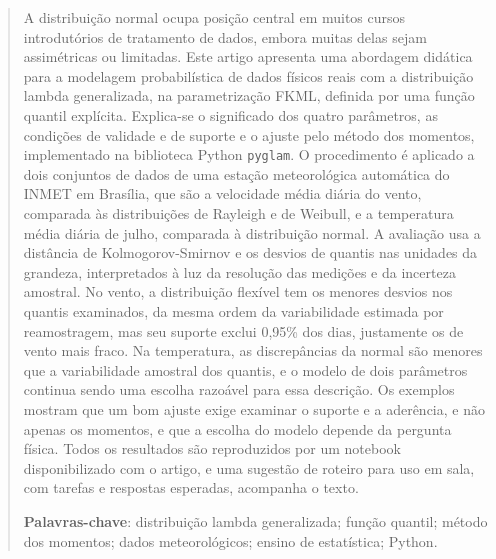 \begin{otherlanguage}{brazilian}
\begin{abstract}
A distribuição normal ocupa posição central em muitos cursos introdutórios de tratamento de dados, embora muitas delas sejam assimétricas ou limitadas. Este artigo apresenta uma abordagem didática para a modelagem probabilística de dados físicos reais com a distribuição lambda generalizada, na parametrização FKML, definida por uma função quantil explícita. Explica-se o significado dos quatro parâmetros, as condições de validade e de suporte e o ajuste pelo método dos momentos, implementado na biblioteca Python \texttt{pyglam}. O procedimento é aplicado a dois conjuntos de dados de uma estação meteorológica automática do INMET em Brasília, que são a velocidade média diária do vento, comparada às distribuições de Rayleigh e de Weibull, e a temperatura média diária de julho, comparada à distribuição normal. A avaliação usa a distância de Kolmogorov-Smirnov e os desvios de quantis nas unidades da grandeza, interpretados à luz da resolução das medições e da incerteza amostral. No vento, a distribuição flexível tem os menores desvios nos quantis examinados, da mesma ordem da variabilidade estimada por reamostragem, mas seu suporte exclui 0,95\% dos dias, justamente os de vento mais fraco. Na temperatura, as discrepâncias da normal são menores que a variabilidade amostral dos quantis, e o modelo de dois parâmetros continua sendo uma escolha razoável para essa descrição. Os exemplos mostram que um bom ajuste exige examinar o suporte e a aderência, e não apenas os momentos, e que a escolha do modelo depende da pergunta física. Todos os resultados são reproduzidos por um notebook disponibilizado com o artigo, e uma sugestão de roteiro para uso em sala, com tarefas e respostas esperadas, acompanha o texto.

\medskip
\noindent\textbf{Palavras-chave}: distribuição lambda generalizada; função quantil; método dos momentos; dados meteorológicos; ensino de estatística; Python.
\end{abstract}
\end{otherlanguage}
